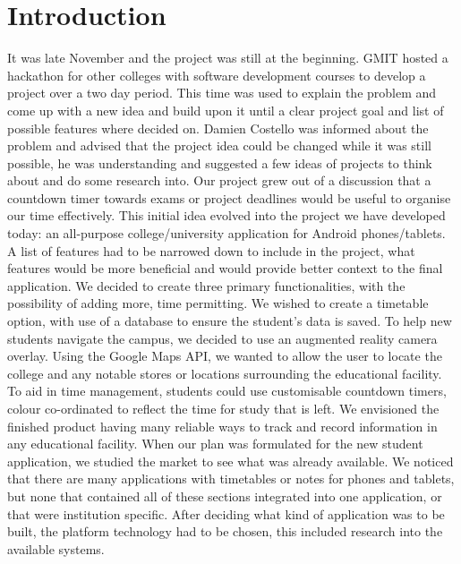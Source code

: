 \chapter{Introduction}
It was late November and the project was still at the beginning. GMIT hosted a hackathon for other colleges with software development courses to develop a project over a two day period. This time was used to explain the problem and come up with a new idea and build upon it until a clear project goal and list of possible features where decided on. Damien Costello was informed about the problem and advised that the project idea could be changed while it was still possible, he was understanding and suggested a few ideas of projects to think about and do some research into. Our project grew out of a discussion that a countdown timer towards exams or project deadlines would be useful to organise our time effectively. This initial idea evolved into the project we have developed today: an all-purpose college/university application for Android phones/tablets. A list of features had to be narrowed down to include in the project, what features would be more beneficial and would provide better context to the final application. We decided to create three primary functionalities, with the possibility of adding more, time permitting. We wished to create a timetable option, with use of a database to ensure the student’s data is saved. To help new students navigate the campus, we decided to use an augmented reality camera overlay. Using the Google Maps API, we wanted to allow the user to locate the college and any notable stores or locations surrounding the educational facility. To aid in time management, students could use customisable countdown timers, colour co-ordinated to reflect the time for study that is left. 
We envisioned the finished product having many reliable ways to track and record information in any educational facility. When our plan was formulated for the new student application, we studied the market to see what was already available. We noticed that there are many applications with timetables or notes for phones and tablets, but none that contained all of these sections integrated into one application, or that were institution specific. After deciding what kind of application was to be built, the platform technology had to be chosen, this included research into the available systems.
 
